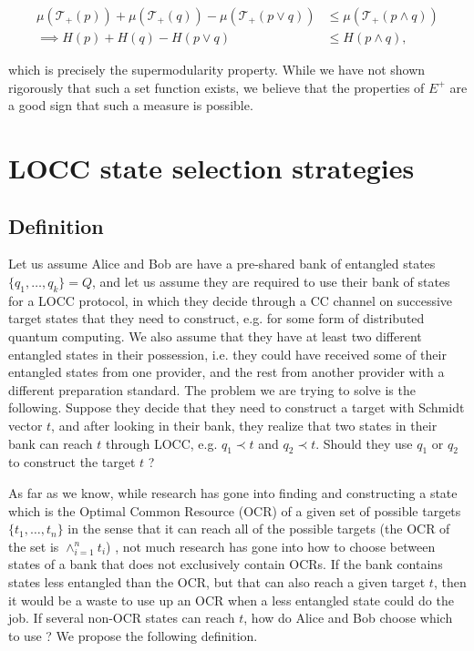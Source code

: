 \begin{align}
    \mu\left(\mathcal{T}_+(p)\right) + \mu\left(\mathcal{T}_+(q)\right) - \mu\left(\mathcal{T}_+(p \vee q)\right) &\leq \mu\left(\mathcal{T}_+(p \wedge q)\right)\\
    \implies H(p) + H(q) - H(p \vee q) &\leq H(p \wedge q),
\end{align}

\noindent which is precisely the supermodularity property. While we have not shown rigorously that such a set function exists, we believe that the properties of $E^+$ are a good sign that such a measure is possible.



\section{LOCC state selection strategies} \label{sec:strategies}

\subsection{Definition}

Let us assume Alice and Bob are have a pre-shared bank of entangled states $\{q_1, \dots, q_k\} = Q$, and let us assume they are required to use their bank of states for a LOCC protocol, in which they decide through a CC channel on successive target states that they need to construct, e.g. for some form of distributed quantum computing. We also assume that they have at least two different entangled states in their possession, i.e. they could have received some of their entangled states from one provider, and the rest from another provider with a different preparation standard. The problem we are trying to solve is the following. Suppose they decide that they need to construct a target with Schmidt vector $t$, and after looking in their bank, they realize that two states in their bank can reach $t$ through LOCC, e.g. $q_1 \prec t$ and $q_2 \prec t$. Should they use $q_1$ or $q_2$ to construct the target $t$ ?

As far as we know, while research has gone into finding and constructing a state which is the Optimal Common Resource (OCR) of a given set of possible targets $\{t_1, \dots, t_n\}$ in the sense that it can reach all of the possible targets (the OCR of the set is $\wedge_{i=1}^n t_i$) \cite{bosyk_optimal_2019, deside_probabilistic_2024}, not much research has gone into how to choose between states of a bank that does not exclusively contain OCRs. If the bank contains states less entangled than the OCR, but that can also reach a given target $t$, then it would be a waste to use up an OCR when a less entangled state could do the job. If several non-OCR states can reach $t$, how do Alice and Bob choose which to use ? We propose the following definition.

